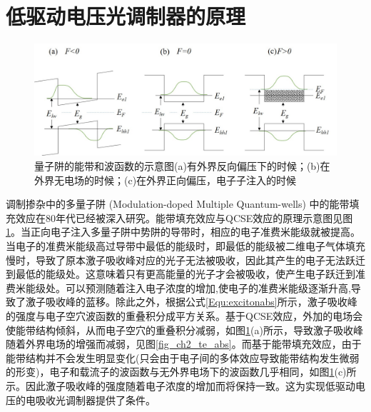 \section{低驱动电压光调制器的原理}
\begin{figure}[htb]
	\centering
	\includegraphics[width=14cm]{./Pictures/fig_ch4_bandfilling_diag.jpg}
	\caption{ 量子阱的能带和波函数的示意图(a)有外界反向偏压下的时候；(b)在外界无电场的时候；(c)在外界正向偏压，电子子注入的时候}
	\label{fig_ch4_band_lineup}
\end{figure}
调制掺杂中的多量子阱 (Modulation-doped Multiple Quantum-wells) 中的能带填充效应在80年代已经被深入研究\cite{livescu1988free}。能带填充效应与QCSE效应的原理示意图见图\ref{fig_ch4_band_lineup}。当正向电子注入多量子阱中势阱的导带时，相应的电子准费米能级就被提高。当电子的准费米能级高过导带中最低的能级时，即最低的能级被二维电子气体填充慢时，导致了原本激子吸收峰对应的光子无法被吸收，因此其产生的电子无法跃迁到最低的能级处。这意味着只有更高能量的光子才会被吸收，使产生电子跃迁到准费米能级处。可以预测随着注入电子浓度的增加,使电子的准费米能级逐渐升高,导致了激子吸收峰的蓝移。除此之外，根据公式\ref{Equ:excitonabs}所示，激子吸收峰的强度与电子空穴波函数的重叠积分成平方关系。基于QCSE效应，外加的电场会使能带结构倾斜，从而电子空穴的重叠积分减弱，如图\ref{fig_ch4_band_lineup}(a)所示，导致激子吸收峰随着外界电场的增强而减弱，见图\ref{fig_ch2_te_abs}。而基于能带填充效应，由于能带结构并不会发生明显变化(只会由于电子间的多体效应导致能带结构发生微弱的形变\cite{livescu1988free})，电子和载流子的波函数与无外界电场下的波函数几乎相同，如图\ref{fig_ch4_band_lineup}(c)所示。因此激子吸收峰的强度随着电子浓度的增加而将保持一致。这为实现低驱动电压的电吸收光调制器提供了条件。

